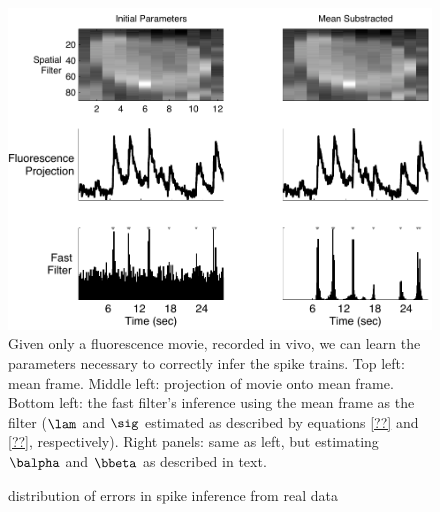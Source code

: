 
\newpage \begin{figure}[H]
\centering \includegraphics[width=.9\linewidth]{../figs/spatial_data}
\caption{Given only a fluorescence movie, recorded in vivo, we can learn the parameters necessary to correctly infer the spike trains. Top left: mean frame.  Middle left: projection of movie onto mean frame. Bottom left: the fast filter's inference using the mean frame as the filter ($\lam$ and $\sig$ estimated as described by equations \eqref{??} and \eqref{??}, respectively).  Right panels: same as left, but estimating $\balpha$ and $\bbeta$ as described in text.} \label{fig:spatial_data}
\end{figure}

\newpage \begin{figure}[H]
\caption{distribution of errors in spike inference from real data} \label{fig:err}
\end{figure}



